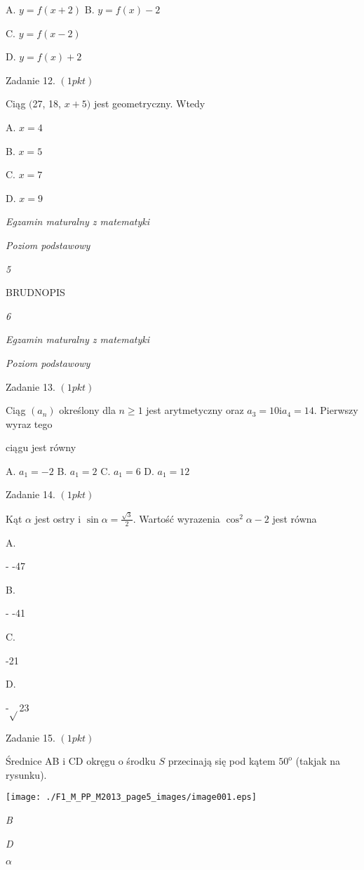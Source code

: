 \documentclass[a4paper,12pt]{article}
\begin{document}
A. $y=f(x+2)$ B. $y=f(x)-2$

C. $y=f(x-2)$

D. $y=f(x)+2$

Zadanie 12. $(1pkt)$

Ciąg $($27, 18, $x+5)$ jest geometryczny. Wtedy

A. $x=4$

B. $x=5$

C. $x=7$

D. $x=9$





{\it Egzamin maturalny z matematyki}

{\it Poziom podstawowy}

{\it 5}

BRUDNOPIS





{\it 6}

{\it Egzamin maturalny z matematyki}

{\it Poziom podstawowy}

Zadanie 13. $(1pkt)$

Ciąg $(a_{n})$ określony dla $n\geq 1$ jest arytmetyczny oraz $a_{3}=10 \mathrm{i}a_{4}=14$. Pierwszy wyraz tego

ciągu jest równy

A. $a_{1}=-2$ B. $a_{1}=2$ C. $a_{1}=6$ D. $a_{1}=12$

Zadanie 14. $(1pkt)$

Kąt $\alpha$ jest ostry i $\displaystyle \sin\alpha=\frac{\sqrt{3}}{2}$. Wartość wyrazenia $\cos^{2}\alpha-2$ jest równa

A.

- -47

B.

- -41

C.

-21

D.

-$\sqrt{}$23

Zadanie 15. $(1pkt)$

Średnice AB $\mathrm{i}$ CD okręgu o środku $S$ przecinają się pod kątem $50^{\mathrm{o}}$ (takjak na rysunku).
\begin{center}
\texttt{[image: ./F1\_M\_PP\_M2013\_page5\_images/image001.eps]}
\end{center}
{\it B}

{\it D}

$\alpha$
\end{document}

